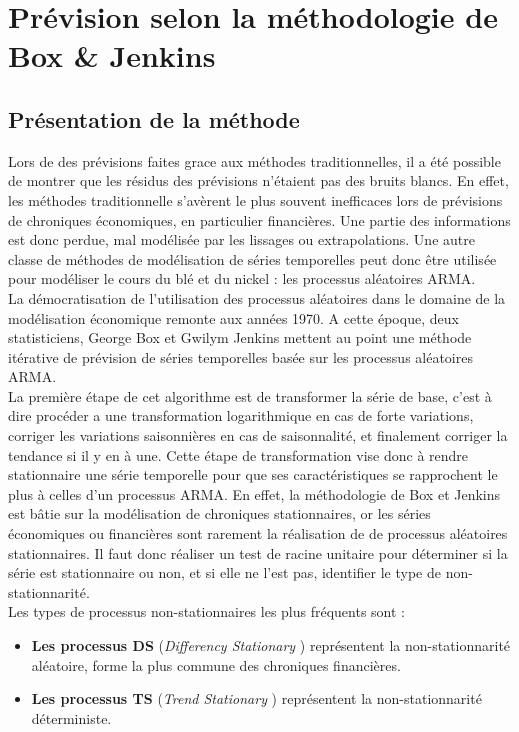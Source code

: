 \section{Prévision selon la méthodologie de Box \& Jenkins}
\subsection{Présentation de la méthode}
Lors de des prévisions faites grace aux méthodes traditionnelles, il a été possible de montrer que les résidus des prévisions n'étaient pas des bruits blancs. En effet, 
les méthodes traditionnelle s'avèrent le plus souvent inefficaces lors de prévisions de chroniques économiques, en particulier financières. Une partie des informations est 
donc perdue, mal modélisée par les lissages ou extrapolations. Une autre classe de méthodes de modélisation de séries temporelles peut donc être utilisée pour modéliser le 
cours du blé et du nickel : les processus aléatoires ARMA.\\[11pt]
La démocratisation de l'utilisation des processus aléatoires dans le domaine de la modélisation économique remonte aux années 1970. A cette époque, deux statisticiens, 
George Box et Gwilym Jenkins mettent au point une méthode itérative de prévision de séries temporelles basée sur les processus aléatoires ARMA. \\[11pt]
La première étape de cet algorithme est de transformer la série de base, c'est à dire procéder a une transformation logarithmique en cas de forte variations, corriger les 
variations saisonnières en cas de saisonnalité, et finalement corriger la tendance si il y en à une. Cette étape de transformation vise donc à rendre stationnaire une 
série temporelle pour que ses caractéristiques se rapprochent le plus à celles d'un processus ARMA. En effet, la méthodologie de Box et Jenkins est bâtie sur la 
modélisation de chroniques stationnaires, or les séries économiques ou financières sont rarement la réalisation de de processus aléatoires stationnaires. Il faut donc 
réaliser un test de racine unitaire pour déterminer si la série est stationnaire ou non, et si elle ne l'est pas, identifier le type de non-stationnarité.\\[11pt]
Les types de processus non-stationnaires les plus fréquents sont :
\begin{itemize}
    \item \textbf{Les processus DS}  (\textit{Differency Stationary} ) représentent la non-stationnarité aléatoire, forme la plus commune des chroniques financières.
    \item \textbf{Les processus TS}  (\textit{Trend Stationary} ) représentent la non-stationnarité déterministe.
\end{itemize}
